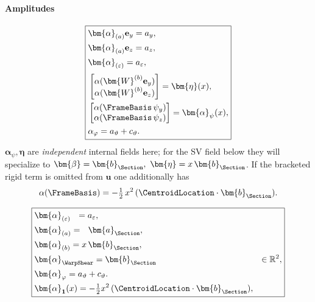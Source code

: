\paragraph{Amplitudes}
\[
\boxed{
\begin{aligned}
&\bm{\alpha}_{(a)}\mathbf{e}_y=a_y,\\
&\bm{\alpha}_{(a)}\mathbf{e}_z=a_z,\\
&\bm{\alpha}_{(\varepsilon)}=a_\varepsilon,\\[2pt]
&\begin{bmatrix}\alpha(\bm{W}^{(b)}\mathbf{e}_y)\\ \alpha(\bm{W}^{(b)}\mathbf{e}_z)\end{bmatrix}=\bm{\eta}(x),\\
&\begin{bmatrix}\alpha(\FrameBasis\,\psi_y)\\ \alpha(\FrameBasis\,\psi_z)\end{bmatrix}=\bm{\alpha}_{\psi}(x),\\
&\alpha_\varphi=a_\vartheta+c_\vartheta.
\end{aligned}}
\]
\(\bm{\alpha}_{\psi},\bm{\eta}\) are \emph{independent} internal fields here; for the SV field below they will specialize to \(\bm{\beta}=\bm{b}_{\Section},\ \bm{\eta}=x\,\bm{b}_{\Section}\). 
If the bracketed rigid term is omitted from \(\bm{u}\) one additionally has 
\[
\alpha(\FrameBasis)=-\tfrac{1}{2}\,x^2\,(\CentroidLocation\cdot\bm{b}_{\Section}).
\]

\begin{equation*}
\boxed{
\begin{aligned}
&\bm{\alpha}_{(\varepsilon)}~~=a_\varepsilon,\\
&\bm{\alpha}_{(a)}=~~\bm{a}_{\Section},\\
&\bm{\alpha}_{(b)}=x\,\bm{b}_{\Section},\\
&\bm{\alpha}_{\WarpShear}=\bm{b}_{\Section} &\in\mathbb{R}^2,\\
&\bm{\alpha}_\varphi=a_\vartheta+c_\vartheta.\\
&\bm{\alpha}_{\mathbf{1}}(x)=-\tfrac{1}{2} x^2\,(\CentroidLocation\cdot\bm{b}_{\Section}),\\
\end{aligned}}
\end{equation*}


